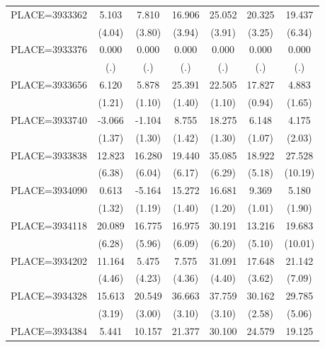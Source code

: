 {\begin{tabular}{l*{6}{c}}
PLACE=3933362       &       5.103&       7.810&      16.906&      25.052&      20.325&      19.437\\
                    &      (4.04)&      (3.80)&      (3.94)&      (3.91)&      (3.25)&      (6.34)\\
PLACE=3933376       &       0.000&       0.000&       0.000&       0.000&       0.000&       0.000\\
                    &         (.)&         (.)&         (.)&         (.)&         (.)&         (.)\\
PLACE=3933656       &       6.120&       5.878&      25.391&      22.505&      17.827&       4.883\\
                    &      (1.21)&      (1.10)&      (1.40)&      (1.10)&      (0.94)&      (1.65)\\
PLACE=3933740       &      -3.066&      -1.104&       8.755&      18.275&       6.148&       4.175\\
                    &      (1.37)&      (1.30)&      (1.42)&      (1.30)&      (1.07)&      (2.03)\\
PLACE=3933838       &      12.823&      16.280&      19.440&      35.085&      18.922&      27.528\\
                    &      (6.38)&      (6.04)&      (6.17)&      (6.29)&      (5.18)&     (10.19)\\
PLACE=3934090       &       0.613&      -5.164&      15.272&      16.681&       9.369&       5.180\\
                    &      (1.32)&      (1.19)&      (1.40)&      (1.20)&      (1.01)&      (1.90)\\
PLACE=3934118       &      20.089&      16.775&      16.975&      30.191&      13.216&      19.683\\
                    &      (6.28)&      (5.96)&      (6.09)&      (6.20)&      (5.10)&     (10.01)\\
PLACE=3934202       &      11.164&       5.475&       7.575&      31.091&      17.648&      21.142\\
                    &      (4.46)&      (4.23)&      (4.36)&      (4.40)&      (3.62)&      (7.09)\\
PLACE=3934328       &      15.613&      20.549&      36.663&      37.759&      30.162&      29.785\\
                    &      (3.19)&      (3.00)&      (3.10)&      (3.10)&      (2.58)&      (5.06)\\
PLACE=3934384       &       5.441&      10.157&      21.377&      30.100&      24.579&      19.125\\

\end{tabular}}
